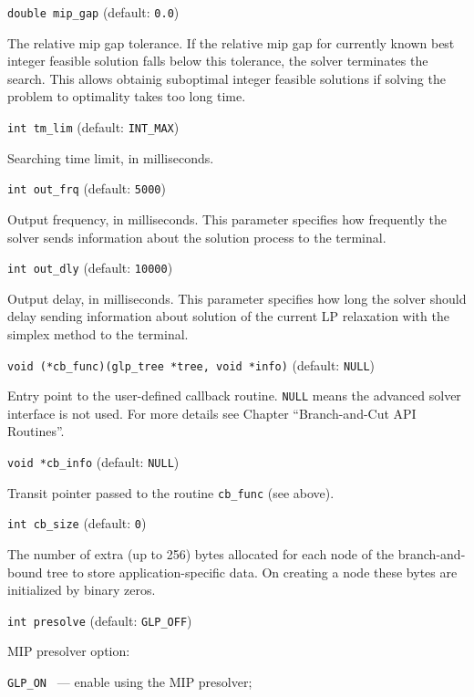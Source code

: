 \bigskip

{\tt double mip\_gap} (default: {\tt 0.0})

The relative mip gap tolerance. If the relative mip gap for currently
known best integer feasible solution falls below this tolerance, the
solver terminates the search. This allows obtainig suboptimal integer
feasible solutions if solving the problem to optimality takes too long
time.

\bigskip

{\tt int tm\_lim} (default: {\tt INT\_MAX})

Searching time limit, in milliseconds.

\bigskip

{\tt int out\_frq} (default: {\tt 5000})

Output frequency, in milliseconds. This parameter specifies how
frequently the solver sends information about the solution process to
the terminal.

\bigskip

{\tt int out\_dly} (default: {\tt 10000})

Output delay, in milliseconds. This parameter specifies how long the
solver should delay sending information about solution of the current
LP relaxation with the simplex method to the terminal.

\bigskip

{\tt void (*cb\_func)(glp\_tree *tree, void *info)}
(default: {\tt NULL})

Entry point to the user-defined callback routine. \verb|NULL| means
the advanced solver interface is not used. For more details see Chapter
``Branch-and-Cut API Routines''.

\bigskip

{\tt void *cb\_info} (default: {\tt NULL})

Transit pointer passed to the routine \verb|cb_func| (see above).

\bigskip

{\tt int cb\_size} (default: {\tt 0})

The number of extra (up to 256) bytes allocated for each node of the
branch-and-bound tree to store application-specific data. On creating
a node these bytes are initialized by binary zeros.

\bigskip

{\tt int presolve} (default: {\tt GLP\_OFF})

MIP presolver option:

\verb|GLP_ON | --- enable using the MIP presolver;

